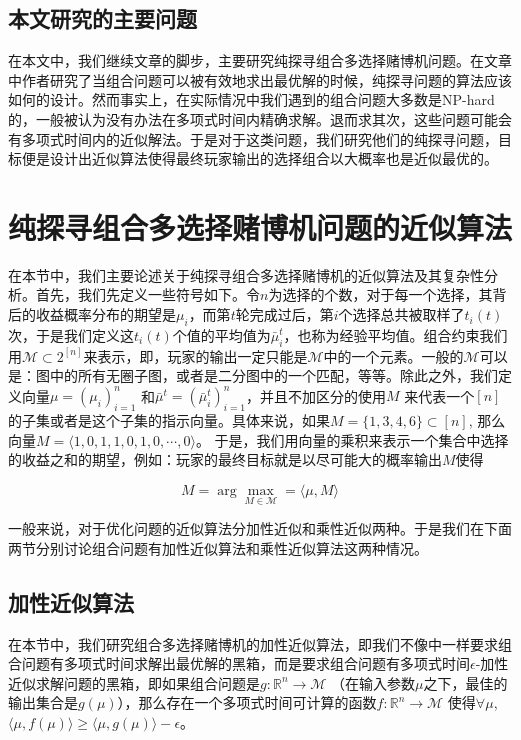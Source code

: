 \documentclass[bachelor]{thuthesis}
\begin{document}
\section{本文研究的主要问题}

在本文中，我们继续文章\cite{cpemab}的脚步，主要研究纯探寻组合多选择赌博机问题。在文章\cite{cpemab}中作者研究了当组合问题可以被有效地求出最优解的时候，纯探寻问题的算法应该如何的设计。然而事实上，在实际情况中我们遇到的组合问题大多数是NP-hard的，一般被认为没有办法在多项式时间内精确求解。退而求其次，这些问题可能会有多项式时间内的近似解法。于是对于这类问题，我们研究他们的纯探寻问题，目标便是设计出近似算法使得最终玩家输出的选择组合以大概率也是近似最优的。




\chapter{纯探寻组合多选择赌博机问题的近似算法}
\label{cha:china}


在本节中，我们主要论述关于纯探寻组合多选择赌博机的近似算法及其复杂性分析。首先，我们先定义一些符号如下。令$n$为选择的个数，对于每一个选择，其背后的收益概率分布的期望是$\mu_i$，而第$t$轮完成过后，第$i$个选择总共被取样了$t_i(t)$次，于是我们定义这$t_i(t)$个值的平均值为$\bar{\mu}^t_i$，也称为经验平均值。组合约束我们用$\mathcal{M}\subset 2^{[n]}$来表示，即，玩家的输出一定只能是$\mathcal{M}$中的一个元素。一般的$\mathcal{M}$可以是：图中的所有无圈子图，或者是二分图中的一个匹配，等等。除此之外，我们定义向量$\mu=(\mu_i)_{i=1}^{n}$ 和$\bar{\mu}^t=(\bar{\mu}^t_i)_{i=1}^{n}$，并且不加区分的使用$M$ 来代表一个$[n]$ 的子集或者是这个子集的指示向量。具体来说，如果$M=\{1,3,4,6\}\subset [n]$, 那么向量$M=\langle 1,0,1,1,0,1,0,\cdots,0\rangle$。 于是，我们用向量的乘积来表示一个集合中选择的收益之和的期望，例如：玩家的最终目标就是以尽可能大的概率输出$M$使得

\[M=\arg\max_{M\in\mathcal{M}}=\langle\mu,M \rangle\]

一般来说，对于优化问题的近似算法分加性近似和乘性近似两种。于是我们在下面两节分别讨论组合问题有加性近似算法和乘性近似算法这两种情况。

\section{加性近似算法}

在本节中，我们研究组合多选择赌博机的加性近似算法，即我们不像\cite{cpemab}中一样要求组合问题有多项式时间求解出最优解的黑箱，而是要求组合问题有多项式时间$\epsilon$-加性近似求解问题的黑箱，即如果组合问题是$g:\mathbb{R}^n\to \mathcal{M}$ （在输入参数$\mu$之下，最佳的输出集合是$g(\mu)$），那么存在一个多项式时间可计算的函数$f:\mathbb{R}^n\to \mathcal{M}$ 使得$\forall \mu$, $\langle\mu,f(\mu)\rangle\ge \langle\mu,g(\mu)\rangle-\epsilon$。
\end{document}
